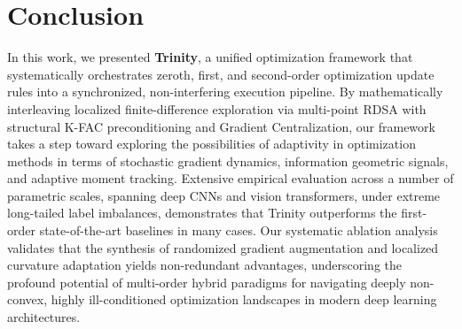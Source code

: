 \documentclass[conference]{IEEEtran}
\begin{document}
\section{Conclusion}
\label{sec:conclusion}

In this work, we presented \textbf{Trinity}, a unified optimization framework that systematically orchestrates zeroth, first, and second-order optimization update rules into a synchronized, non-interfering execution pipeline. By mathematically interleaving localized finite-difference exploration via multi-point RDSA with structural K-FAC preconditioning and Gradient Centralization, our framework takes a step toward exploring the possibilities of adaptivity in optimization methods in terms of stochastic gradient dynamics, information geometric signals, and adaptive moment tracking. Extensive empirical evaluation across a number of parametric scales, spanning deep CNNs and vision transformers, under extreme long-tailed label imbalances, demonstrates that Trinity outperforms the first-order state-of-the-art baselines in many cases. Our systematic ablation analysis validates that the synthesis of randomized gradient augmentation and localized curvature adaptation yields non-redundant advantages, underscoring the profound potential of multi-order hybrid paradigms for navigating deeply non-convex, highly ill-conditioned optimization landscapes in modern deep learning architectures. 
\end{document}
